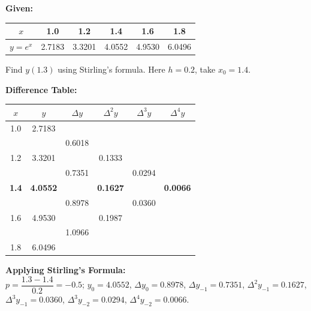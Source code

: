 \documentclass[12pt]{article}
\begin{document}
\begin{exbox}
\textbf{Given:}
\begin{center}
\begin{tabular}{|c|c|c|c|c|c|}
  \hline
  \rowcolor{primary!80}
  {\color{white}$x$} & {\color{white}1.0} & {\color{white}1.2} & {\color{white}1.4} & {\color{white}1.6} & {\color{white}1.8} \\
  \hline
  $y=e^x$ & 2.7183 & 3.3201 & 4.0552 & 4.9530 & 6.0496 \\
  \hline
\end{tabular}
\end{center}
Find $y(1.3)$ using Stirling's formula. Here $h = 0.2$, take $x_0 = 1.4$.

\medskip\textbf{Difference Table:}
\begin{center}
\renewcommand{\arraystretch}{1.3}
\begin{tabular}{|c|c|c|c|c|c|}
  \hline
  \rowcolor{primary!80}
  {\color{white}$x$} & {\color{white}$y$} & {\color{white}$\Delta y$} & {\color{white}$\Delta^2 y$} & {\color{white}$\Delta^3 y$} & {\color{white}$\Delta^4 y$} \\
  \hline
  1.0 & 2.7183 & & & & \\
  \hline
  \rowcolor{lightbg!50}
  & & 0.6018 & & & \\
  \hline
  1.2 & 3.3201 & & 0.1333 & & \\
  \hline
  \rowcolor{lightbg!50}
  & & 0.7351 & & 0.0294 & \\
  \hline
  \rowcolor{accent!10}
  \textbf{1.4} & \textbf{4.0552} & & \textbf{0.1627} & & \textbf{0.0066} \\
  \hline
  \rowcolor{lightbg!50}
  & & 0.8978 & & 0.0360 & \\
  \hline
  1.6 & 4.9530 & & 0.1987 & & \\
  \hline
  \rowcolor{lightbg!50}
  & & 1.0966 & & & \\
  \hline
  1.8 & 6.0496 & & & & \\
  \hline
\end{tabular}
\end{center}

\textbf{Applying Stirling's Formula:}\\[4pt]
$p = \dfrac{1.3 - 1.4}{0.2} = -0.5$;\quad
$y_0=4.0552$,\; $\Delta y_0=0.8978$,\; $\Delta y_{-1}=0.7351$,\;
$\Delta^2 y_{-1}=0.1627$,\; $\Delta^3 y_{-1}=0.0360$,\; $\Delta^3 y_{-2}=0.0294$,\; $\Delta^4 y_{-2}=0.0066$.


\end{exbox}
\end{document}
